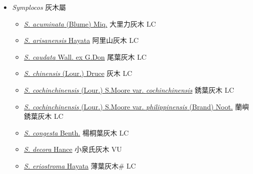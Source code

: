 
  \begin{itemize}
 \item[] \textit{Symplocos} 灰木屬
                    
  \begin{itemize}
        \item[] \href{http://www.theplantlist.org/tpl1.1/search?q=Symplocos+acuminata}{\textit{S. acuminata} (Blume) Miq.}   大里力灰木 LC
        \item[] \href{http://www.theplantlist.org/tpl1.1/search?q=Symplocos+arisanensis}{\textit{S. arisanensis} Hayata}   阿里山灰木 LC
        \item[] \href{http://www.theplantlist.org/tpl1.1/search?q=Symplocos+caudata}{\textit{S. caudata} Wall. ex G.Don}   尾葉灰木 LC
        \item[] \href{http://www.theplantlist.org/tpl1.1/search?q=Symplocos+chinensis}{\textit{S. chinensis} (Lour.) Druce}   灰木 LC
        \item[] \href{http://www.theplantlist.org/tpl1.1/search?q=Symplocos+cochinchinensis+var.+cochinchinensis}{\textit{S. cochinchinensis} (Lour.) S.Moore var. \textit{cochinchinensis}}   銹葉灰木 LC
        \item[] \href{http://www.theplantlist.org/tpl1.1/search?q=Symplocos+cochinchinensis+var.+philippinensis}{\textit{S. cochinchinensis} (Lour.) S.Moore var. \textit{philippinensis} (Brand) Noot.}   蘭嶼銹葉灰木 LC
        \item[] \href{http://www.theplantlist.org/tpl1.1/search?q=Symplocos+congesta}{\textit{S. congesta} Benth.}   楊桐葉灰木 LC
        \item[] \href{http://www.theplantlist.org/tpl1.1/search?q=Symplocos+decora}{\textit{S. decora} Hance}   小泉氏灰木 VU
        \item[] \href{http://www.theplantlist.org/tpl1.1/search?q=Symplocos+eriostroma}{\textit{S. eriostroma} Hayata}   薄葉灰木\# LC

\end{itemize}
\end{itemize}
